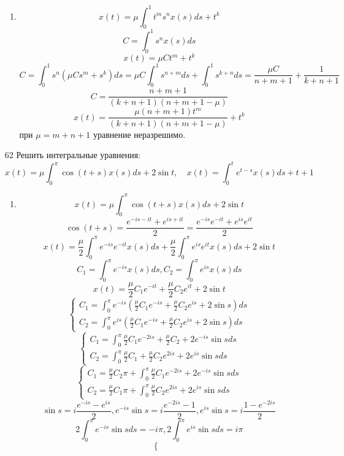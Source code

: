 \documentclass[a4paper, 12pt]{report}
\theoremstyle{definition}
\theoremstyle{remark}
\begin{document}
\begin{large}
\begin{enumerate}
\begin{enumerate}
        \item \[x(t) = \mu \int_0^1 t^m s^n x(s) ds + t^k\]
        \[C = \int_0^1 s^n x(s) ds\]
        \[x(t) = \mu C t^m + t^k\]
        \[C = \int_0^1 s^n (\mu C s^m + s^k)ds = \mu C \int_0^1 s^{n+m} ds + \int_0^1 s^{k+n} ds  = \frac{\mu C}{n+m+1} + \frac{1}{k+n+1}\]
        \[C = \frac{n+m+1}{(k+n+1)(n+m+1-\mu)}\]
        \[x(t) = \frac{\mu(n+m+1)t^m}{(k+n+1)(n+m+1-\mu)} + t^k\]
        при $\mu = m+n+1$ уравнение неразрешимо.
    \end{enumerate}
    \item[62] Решить интегральные уравнения:
    \[x(t) = \mu \int_0^\pi \cos(t+s) x(s) ds + 2\sin t, \quad x(t) = \int_0^t e^{t-s} x(s) ds + t +1\]
    \begin{enumerate}
        \item \[x(t) = \mu \int_0^\pi \cos(t+s) x(s) ds + 2\sin t\]
        \[\cos(t+s) = \frac{e^{-is-it} + e^{is+it}}{2} = \frac{e^{-is}e^{-it} + e^{is}e^{it}}{2}\]
        \[x(t) = \frac{\mu}{2} \int_0^\pi e^{-is}e^{-it}x(s)ds + \frac{\mu}{2} \int_0^\pi e^{is}e^{it} x(s) ds + 2\sin t\]
        \[C_1 = \int_0^\pi e^{-is}x(s)ds, C_2 = \int_0^\pi e^{is} x(s) ds\]
        \[x(t) = \frac{\mu}{2}C_1 e^{-it} + \frac{\mu}{2} C_2 e^{it} + 2\sin t\]
        \[\begin{cases}
            C_1 = \int_0^\pi e^{-is} (\frac{\mu}{2}C_1 e^{-is} + \frac{\mu}{2} C_2 e^{is} + 2\sin s)ds \\
            C_2 = \int_0^\pi e^{is} (\frac{\mu}{2}C_1 e^{-is} + \frac{\mu}{2} C_2 e^{is} + 2\sin s) ds
        \end{cases}\]
        \[\begin{cases}
            C_1 = \int_0^\pi \frac{\mu}{2}C_1 e^{-2is} + \frac{\mu}{2} C_2 + 2e^{-is} \sin s ds \\
            C_2 = \int_0^\pi \frac{\mu}{2}C_1 + \frac{\mu}{2} C_2 e^{2is} + 2e^{is} \sin s ds
        \end{cases}\]
        \[\begin{cases}
            C_1 = \frac{\mu}{2} C_2 \pi + \int_0^\pi \frac{\mu}{2}C_1 e^{-2is} + 2e^{-is} \sin s ds \\
            C_2 = \frac{\mu}{2}C_1 \pi + \int_0^\pi \frac{\mu}{2} C_2 e^{2is} + 2e^{is} \sin s ds
        \end{cases}\]
        \[\sin s = i \frac{e^{-i s}- e^{is}}{2}, e^{-is}\sin s = i\frac{e^{-2is}- 1}{2}, e^{is} \sin s = i\frac{1- e^{-2is}}{2}\]
        \[2\int_0^\pi e^{-is}\sin s ds = -i\pi, 2\int_0^\pi e^{is}\sin s ds = i\pi\]
        \[\begin{cases}

\end{cases}\]
\end{enumerate}
\end{enumerate}
\end{large}
\end{document}
